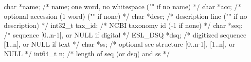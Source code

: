 \begin{cchunk}
  char    *name;           /* name; one word, no whitespace ("\0" if no name)  */
  char    *acc;            /* optional accession (1 word) ("\0" if none)       */
  char    *desc;           /* description line ("\0" if no description)        */
  int32_t  tax_id;         /* NCBI taxonomy id (-1 if none)                    */
  char    *seq;            /* sequence [0..n-1], or NULL if digital            */
  ESL_DSQ *dsq;            /* digitized sequence [1..n], or NULL if text       */
  char    *ss;             /* optional sec structure [0..n-1], [1..n], or NULL */
  int64_t  n;              /* length of seq (or dsq) and ss                    */
\end{cchunk}
